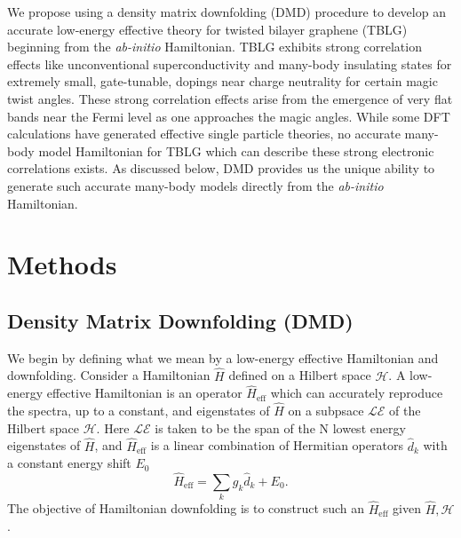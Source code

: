 \documentclass[12pt]{article}
\begin{document}
We propose using a density matrix downfolding (DMD) procedure to develop an accurate low-energy effective theory for twisted bilayer graphene (TBLG) beginning from the \textit{ab-initio} Hamiltonian.
TBLG exhibits strong correlation effects like unconventional superconductivity and many-body insulating states for extremely small, gate-tunable, dopings near charge neutrality for certain magic twist angles.
These strong correlation effects arise from the emergence of very flat bands near the Fermi level as one approaches the magic angles.
While some DFT calculations have generated effective single particle theories, no accurate many-body model Hamiltonian for TBLG which can describe these strong electronic correlations exists.
As discussed below, DMD provides us the unique ability to generate such accurate many-body models directly from the \textit{ab-initio} Hamiltonian.

\section{Methods}
\subsection{Density Matrix Downfolding (DMD)}
We begin by defining what we mean by a low-energy effective Hamiltonian and downfolding.
Consider a Hamiltonian $\hat{H}$ defined on a Hilbert space $\mathcal{H}$.
A low-energy effective Hamiltonian is an operator $\hat{H}_\text{eff}$ which can accurately reproduce the spectra, up to a constant, and eigenstates of $\hat{H}$ on a subpsace $\mathcal{LE}$ of the Hilbert space $\mathcal{H}$.
Here $\mathcal{LE}$ is taken to be the span of the N lowest energy eigenstates of $\hat{H}$, and $\hat{H}_\text{eff}$ is a linear combination of Hermitian operators $\hat{d}_k$ with a constant energy shift $E_0$
\begin{equation}
\hat{H}_\text{eff} = \sum_{k} g_k \hat{d}_k  + E_0.
\label{eq:Heff}
\end{equation}
The objective of Hamiltonian downfolding is to construct such an $\hat{H}_\text{eff}$ given $\hat{H}, \mathcal{H}$.
\end{document}

